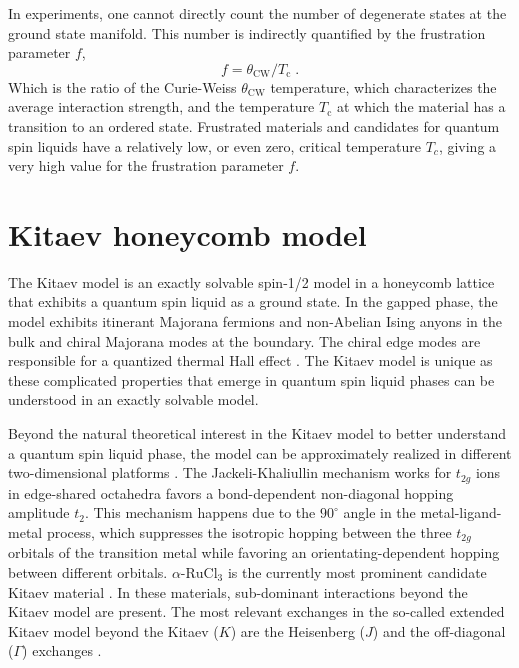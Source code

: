 In experiments, one cannot directly count the number of degenerate states at the ground state manifold.
This number is indirectly quantified by the frustration parameter $f$,
\begin{equation}
    f = \theta_{\mathrm{CW}} /  T_{\mathrm{c}} \; .
\end{equation}
Which is the ratio of the Curie-Weiss $\theta_{\mathrm{CW}}$ temperature, which characterizes the average interaction strength, and the temperature $T_{\mathrm{c}}$ at which the material has a transition to an ordered state.
Frustrated materials and candidates for quantum spin liquids have a relatively low, or even zero, critical temperature $T_c$, giving a very high value for the frustration parameter $f$.

\section*{Kitaev honeycomb model}


The Kitaev model is an exactly solvable spin-1/2 model in a honeycomb lattice that exhibits a quantum spin liquid as a ground state\cite{Kitaev_2006}.
In the gapped phase, the model exhibits itinerant Majorana fermions and non-Abelian Ising anyons in the bulk and chiral Majorana modes at the boundary.
The chiral edge modes are responsible for a quantized thermal Hall effect \cite{Kitaev2006}.
The Kitaev model is unique as these complicated properties that emerge in quantum spin liquid phases can be understood in an exactly solvable model.


Beyond the natural theoretical interest in the Kitaev model to better understand a quantum spin liquid phase, the model can be approximately realized in different two-dimensional platforms \cite{Jackeli2009, Trebst2022, Winter2017, Winter2017rev, Takagi2019}.
The Jackeli-Khaliullin mechanism works for $t_{2g}$ ions in edge-shared octahedra favors a bond-dependent non-diagonal hopping amplitude $t_2$.
This mechanism happens due to the $90^\circ$ angle in the metal-ligand-metal process, which suppresses the isotropic hopping between the three  $t_{2g}$ orbitals of the transition metal
while favoring an orientating-dependent hopping between different orbitals.
$\alpha\text{-RuCl}_3$ is the currently most prominent candidate Kitaev material \cite{Sandilands2015,Banerjee2016}.
In these materials, sub-dominant interactions beyond the Kitaev model are present. The most relevant exchanges in the so-called extended Kitaev model beyond the Kitaev ($K$) are the Heisenberg ($J$) and the off-diagonal ($\Gamma$) exchanges \cite{Rau2014,Rousochatzakis2023}.

